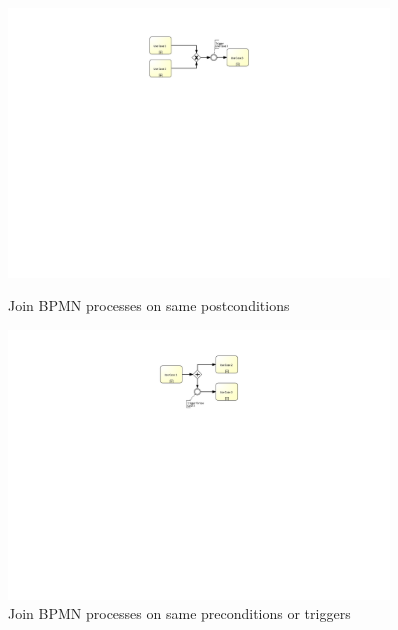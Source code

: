 \begin{figure}[h!]
	\centering
	\begin{minipage}{0.45\textwidth}
		\centering
		\includegraphics[width=0.9\textwidth, trim={11cm 15cm 12cm 1cm}]{img/JoinBPMNpostcondition.pdf} %
		\caption{Join BPMN processes on same postconditions}
		\label{fig:JoinBPMNPostcondition} %
	\end{minipage}\hfill
	\begin{minipage}{0.45\textwidth}
		\centering
		\includegraphics[width=0.9\textwidth, trim={11cm 15cm 12cm 1cm}]{img/JoinBPMNPrecondition} %
		\caption{Join BPMN processes on same preconditions or triggers}
		\label{fig:JoinBPMNPrecondition}
	\end{minipage}
\end{figure}

